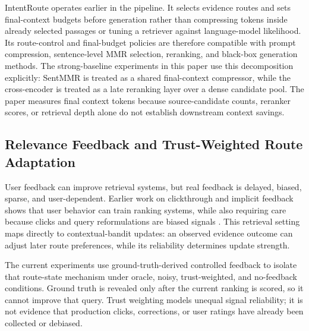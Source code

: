 IntentRoute operates earlier in the pipeline. It selects evidence routes and sets final-context budgets before generation rather than compressing tokens inside already selected passages or tuning a retriever against language-model likelihood. Its route-control and final-budget policies are therefore compatible with prompt compression, sentence-level MMR selection, reranking, and black-box generation methods. The strong-baseline experiments in this paper use this decomposition explicitly: SentMMR is treated as a shared final-context compressor, while the cross-encoder is treated as a late reranking layer over a dense candidate pool. The paper measures final context tokens because source-candidate counts, reranker scores, or retrieval depth alone do not establish downstream context savings.

\subsection{Relevance Feedback and Trust-Weighted Route Adaptation}
\label{sec:03-related-work:relevance-feedback-and-trust-weighted-route-adaptation}

User feedback can improve retrieval systems, but real feedback is delayed, biased, sparse, and user-dependent. Earlier work on clickthrough and implicit feedback shows that user behavior can train ranking systems, while also requiring care because clicks and query reformulations are biased signals \citep{joachims2002clickthrough,radlinski2005querychains}. This retrieval setting maps directly to contextual-bandit updates: an observed evidence outcome can adjust later route preferences, while its reliability determines update strength.

The current experiments use ground-truth-derived controlled feedback to isolate that route-state mechanism under oracle, noisy, trust-weighted, and no-feedback conditions. Ground truth is revealed only after the current ranking is scored, so it cannot improve that query. Trust weighting models unequal signal reliability; it is not evidence that production clicks, corrections, or user ratings have already been collected or debiased.
